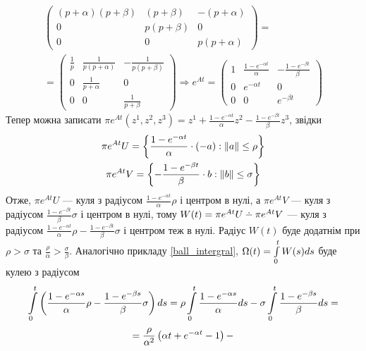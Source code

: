 \begin{example}
\begin{gather*}
\begin{pmatrix}
            (p+\alpha)(p+\beta) & (p+\beta) & -(p+\alpha) \\
            0 & p(p+\beta) & 0 \\
            0 & 0 & p(p+\alpha)
        \end{pmatrix} = \\ =
        \begin{pmatrix}
            \frac{1}{p} & \frac{1}{p(p+\alpha)} & - \frac{1}{p(p+\beta)} \\
            0 & \frac{1}{p+\alpha} & 0 \\
            0 & 0 & \frac{1}{p+\beta}
        \end{pmatrix} \Rightarrow
        e^{At} = \begin{pmatrix}
            1 & \frac{1 - e^{-\alpha t}}{\alpha} & -\frac{1 - e^{-\beta t}}{\beta} \\
            0 & e^{-\alpha t} & 0 \\
            0 & 0 & e^{-\beta t}
        \end{pmatrix}
    \end{gather*}
    Тепер можна записати $\pi e^{At}(z^1, z^2, z^3) = z^1 + \frac{1 - e^{-\alpha t}}{\alpha} z^2 - \frac{1 - e^{-\beta t}}{\beta}z^3$, звідки
    \begin{gather*}
        \pi e^{At} U = \left\{\frac{1 - e^{-\alpha t}}{\alpha} \cdot (-a) : \left\Vert a \right\Vert \leq \rho\right\} \\ 
        \pi e^{At} V = \left\{-\frac{1 - e^{-\beta t}}{\beta} \cdot b : \left\Vert b \right\Vert \leq \sigma\right\}
    \end{gather*}
    Отже, $\pi e^{At} U$ --- куля з радіусом $\frac{1 - e^{-\alpha t}}{\alpha}\rho$ і центром в нулі,
    а $\pi e^{At} V$ --- куля з радіусом $\frac{1 - e^{-\beta t}}{\beta}\sigma$ і центром в нулі, тому
    $W(t) = \pi e^{At}U \setdif \pi e^{At}V$ --- куля з радіусом 
    $\frac{1 - e^{-\alpha t}}{\alpha}\rho - \frac{1 - e^{-\beta t}}{\beta}\sigma$ і центром теж в нулі.
    Радіус $W(t)$ буде додатнім при $\rho > \sigma$ та $\frac{\rho}{\alpha} > \frac{\sigma}{\beta}$.
    Аналогічно прикладу \ref{ball_intergral}, $\Omega(t) = \int\limits_0^t W(s) ds$ буде кулею
    з радіусом
    \begin{gather*}
        \int\limits_0^t \left(\frac{1 - e^{-\alpha s}}{\alpha}\rho - \frac{1 - e^{-\beta s}}{\beta} \sigma\right) ds = 
        \rho \int\limits_0^t \frac{1 - e^{-\alpha s}}{\alpha} ds - \sigma \int\limits_0^t \frac{1 - e^{-\beta s}}{\beta} ds =
    \end{gather*}
    \begin{gather*}
        = \frac{\rho}{\alpha^2}\l(\alpha t + e^{-\alpha t} - 1\r) - 

\end{gather*}
\end{example}
